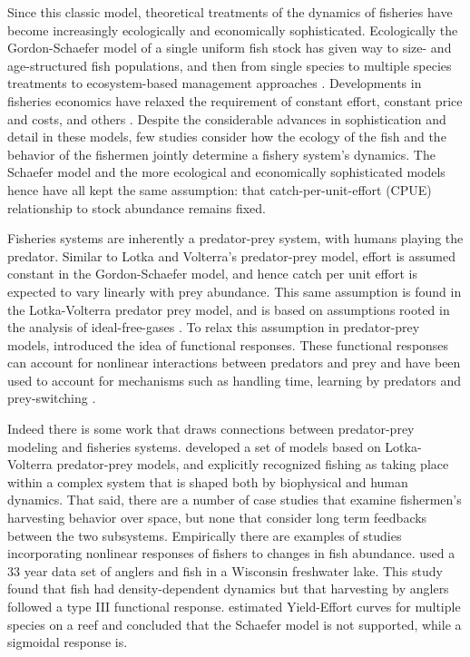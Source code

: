 \documentclass[12pt,a4paper]{report}
\begin{document}
Since this classic model, theoretical treatments of the dynamics of fisheries have become increasingly ecologically and economically sophisticated. Ecologically the Gordon-Schaefer model of a single uniform fish stock has given way to size- and age-structured fish populations, and then from single species to multiple species treatments \citep{May:Science:1979} to ecosystem-based management approaches \citep{Hilborn:2012}. Developments in fisheries economics have relaxed the requirement of constant effort, constant price and costs, and others \citep{Smith:2012}. Despite the considerable advances in sophistication and detail in these models, few studies consider how the ecology of the fish and the behavior of the fishermen jointly determine a fishery system's dynamics. The Schaefer model and the more ecological and economically sophisticated models hence have all kept the same assumption: that catch-per-unit-effort (CPUE) relationship to stock abundance remains fixed. 

Fisheries systems are inherently a predator-prey system, with humans playing the predator. Similar to Lotka and Volterra's predator-prey model, effort is assumed constant in the Gordon-Schaefer model, and hence catch per unit effort is expected to vary linearly with prey abundance. This same assumption is found in the Lotka-Volterra predator prey model, and is based on assumptions rooted in the analysis of ideal-free-gases \citep{HutchinsonWaser:2007, Gurarieetal:2013}. To relax this assumption in predator-prey models, \citep{Holling:1959} introduced the idea of functional responses. These functional responses can account for nonlinear interactions between predators and prey and have been used to account for mechanisms such as handling time, learning by predators and prey-switching \citep{Anderson:2010}. 

Indeed there is some work that draws connections between predator-prey modeling and fisheries systems. \cite{AllenMcGlade:1986} developed a set of models based on Lotka-Volterra predator-prey models, and explicitly recognized fishing as taking place within a complex system that is shaped both by biophysical and human dynamics. That said, there are a number of case studies that examine fishermen's harvesting behavior over space, but none that consider long term feedbacks between the two subsystems. Empirically there are examples of studies incorporating nonlinear responses of fishers to changes in fish abundance. \cite{Carpenteretal:1994} used a 33 year data set of anglers and fish in a Wisconsin freshwater lake. This study found that fish had density-dependent dynamics but that harvesting by anglers followed a type III functional response. \cite{Lorenzenetal:2006} estimated Yield-Effort curves for multiple species on a reef and concluded that the Schaefer model is not supported, while a sigmoidal response is. 
\end{document}
